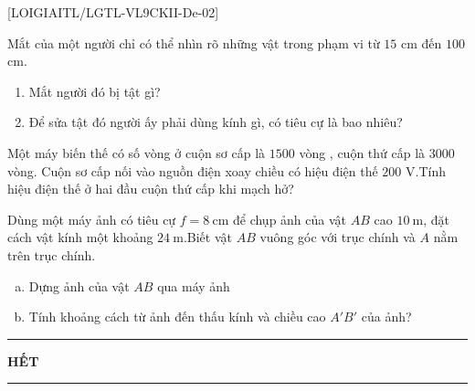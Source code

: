 [LOIGIAITL/LGTL-VL9CKII-De-02]
\begin{bt}[$1{,}0$ điểm] Mắt của một người chỉ có thể nhìn rõ những vật trong phạm vi từ $15$ cm đến $100$ cm.
	\begin{enumerate}
		\item Mắt người đó bị tật gì?
		\item Để sửa tật đó người ấy phải dùng kính gì, có tiêu cự là bao nhiêu?
	\end{enumerate}
	\loigiai{}
\end{bt}
\begin{bt}[$1{,}0$ điểm]Một máy biến thế có số vòng ở cuộn sơ cấp là $1500$ vòng , cuộn thứ cấp là $3000$ vòng. Cuộn  sơ cấp nối vào nguồn điện xoay chiều có hiệu điện thế $200$ V.Tính hiệu điện thế ở hai đầu cuộn thứ cấp khi mạch hở?
	\loigiai{}
\end{bt}
\begin{bt}[$3{,}0$ điểm]Dùng một máy ảnh có tiêu cự $f = 8\mathrm{~cm}$ để chụp ảnh của vật $AB$ cao $10\mathrm{~m}$, đặt cách vật kính một khoảng $24\mathrm{~m}$.Biết vật $AB$ vuông góc với trục chính và $A$ nằm trên trục chính.
	\begin{enumerate}[a)]
		\item Dựng ảnh của vật $AB$ qua máy ảnh
		\item Tính khoảng cách từ ảnh đến thấu kính và chiều cao $A'B'$ của ảnh?
	\end{enumerate}
	\loigiai{}
\end{bt}
\fileend
\begin{center}
	\rule[4pt]{2cm}{1pt}\large \textbf{HẾT}\rule[4pt]{2cm}{1pt}
\end{center}











